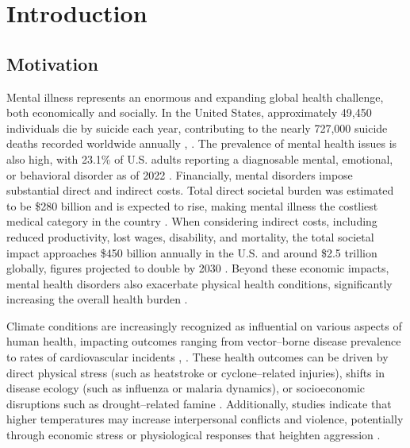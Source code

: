\documentclass[12pt, a4paper]{article}
\begin{document}
\vspace{0.0in}

\setcounter{page}{1}
\section{Introduction}
\subsection{Motivation}
Mental illness represents an enormous and expanding global health challenge, both economically and socially. In the United States, approximately 49,450 individuals die by suicide each year, contributing to the nearly 727,000 suicide deaths recorded worldwide annually \cite{usSuicideStat}, \cite{whoSuicideStat}. The prevalence of mental health issues is also high, with 23.1\% of U.S. adults reporting a diagnosable mental, emotional, or behavioral disorder as of 2022 \cite{usMentalStat}. Financially, mental disorders impose substantial direct and indirect costs. Total direct societal burden was estimated to be \$280 billion and is expected to rise, making mental illness the costliest medical category in the country \cite{MHCost}. When considering indirect costs, including reduced productivity, lost wages, disability, and mortality, the total societal impact approaches \$450 billion annually in the U.S. and around \$2.5 trillion globally, figures projected to double by 2030 \cite{futureMHCost}. Beyond these economic impacts, mental health disorders also exacerbate physical health conditions, significantly increasing the overall health burden \cite{noHealthwoMH}.

Climate conditions are increasingly recognized as influential on various aspects of human health, impacting outcomes ranging from vector--borne disease prevalence to rates of cardiovascular incidents \cite{Patz2014}, \cite{Watts2015}. These health outcomes can be driven by direct physical stress (such as heatstroke or cyclone--related injuries), shifts in disease ecology (such as influenza or malaria dynamics), or socioeconomic disruptions such as drought--related famine \cite{Watts2015}. Additionally, studies indicate that higher temperatures may increase interpersonal conflicts and violence, potentially through economic stress or physiological responses that heighten aggression \cite{Hsiang2013}.
\end{document}
